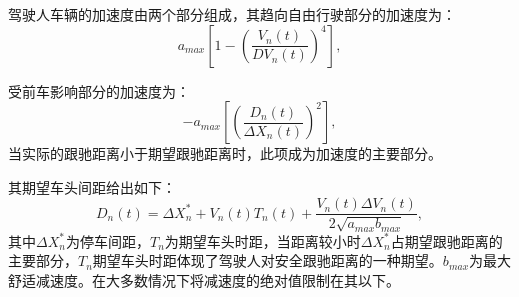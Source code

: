 %

驾驶人车辆的加速度由两个部分组成，其趋向自由行驶部分的加速度为：
\begin{equation}
a_{max}\left[1-\left(\frac{V_n(t)}{DV_n(t)}\right)^4\right],
\end{equation}

受前车影响部分的加速度为：
\begin{equation}
-a_{max}\left[\left(\frac{D_n(t)}{\Delta X_n(t)}\right )^2\right],
\end{equation}
当实际的跟驰距离小于期望跟驰距离时，此项成为加速度的主要部分。

其期望车头间距给出如下：
\begin{equation}
D_n(t)=\Delta X_n^*+V_n(t)T_n(t)+\frac{V_n(t)\Delta V_n(t)}{2\sqrt{a_{max}b_{max}}},
\end{equation}
其中$\Delta X_n^*$为停车间距，$T_n$为期望车头时距，当距离较小时$\Delta X_n^*$占期望跟驰距离的主要部分，$T_n$期望车头时距体现了驾驶人对安全跟驰距离的一种期望。$b_{max}$为最大舒适减速度。在大多数情况下将减速度的绝对值限制在其以下。








